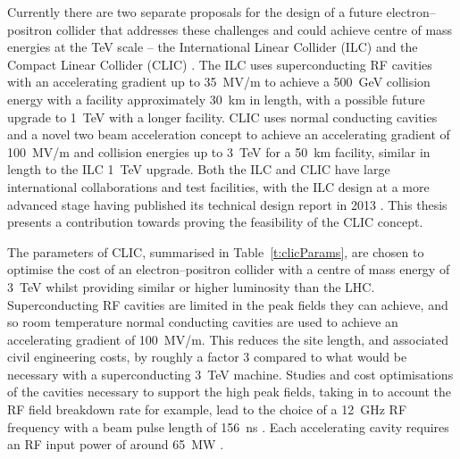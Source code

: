 Currently there are two separate proposals for the design of a future electron--positron collider that addresses these challenges and could achieve centre of mass energies at the TeV scale -- the International Linear Collider (ILC) \cite{ILC} and the Compact Linear Collider (CLIC) \cite{clicCDR}. The ILC uses superconducting RF cavities with an accelerating gradient up to 35~MV/m to achieve a 500~GeV collision energy with a facility approximately 30~km in length, with a possible future upgrade to 1~TeV with a longer facility.  CLIC uses normal conducting cavities and a novel two beam acceleration concept to achieve an accelerating gradient of 100~MV/m and collision energies up to 3~TeV for a 50~km facility, similar in length to the ILC 1~TeV upgrade. Both the ILC and CLIC have large international collaborations and test facilities, with the ILC design at a more advanced stage having published its technical design report in 2013 \cite{ILC}. This thesis presents a contribution towards proving the feasibility of the CLIC concept.


The parameters of CLIC, summarised in Table~\ref{t:clicParams}, are chosen to optimise the cost of an electron--positron collider with a centre of mass energy of 3~TeV whilst providing similar or higher luminosity than the LHC. Superconducting RF cavities are limited in the peak fields they can achieve, and so room temperature normal conducting cavities are used to achieve an accelerating gradient of 100~MV/m. This reduces the site length, and associated civil engineering costs, by roughly a factor 3 compared to what would be necessary with a superconducting 3~TeV machine. Studies and cost optimisations of the cavities necessary to support the high peak fields, taking in to account the RF field breakdown rate for example, lead to the choice of a 12~GHz RF frequency with a beam pulse length of 156~ns \cite{clicCDR}. Each accelerating cavity requires an RF input power of around 65~MW \cite{clicCDR}.

